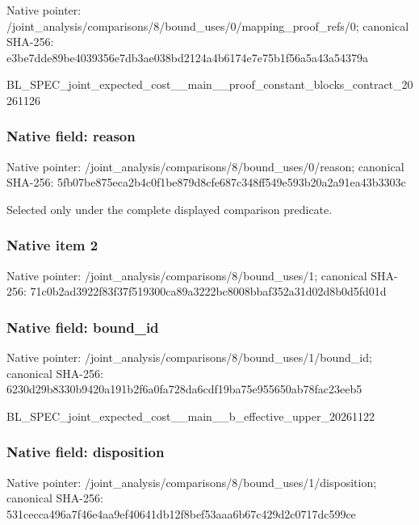 \documentclass[10pt,a4paper]{article}
\begin{document}
Native pointer: /joint\_analysis/comparis\allowbreak{}ons/8/bound\_uses/0/mappi\allowbreak{}ng\_proof\_refs/0; canonical SHA-256: e3be7dde89be4039356e7db3\allowbreak{}ae038bd2124a4b6174e7e75b\allowbreak{}1f56a5a43a54379a


BL\_SPEC\_joint\_expected\_c\allowbreak{}ost\_\_main\_\_proof\_constan\allowbreak{}t\_blocks\_contract\_202611\allowbreak{}26


\subsubsection{Native field: reason}


Native pointer: /joint\_analysis/comparis\allowbreak{}ons/8/bound\_uses/0/reaso\allowbreak{}n; canonical SHA-256: 5fb07be875eca2b4c0f1be87\allowbreak{}9d8cfe687c348ff549e593b2\allowbreak{}0a2a91ea43b3303c


Selected only under the complete displayed comparison predicate.


\subsubsection{Native item 2}


Native pointer: /joint\_analysis/comparis\allowbreak{}ons/8/bound\_uses/1; canonical SHA-256: 71c0b2ad3922f83f37f51930\allowbreak{}0ca89a3222bc8008bbaf352a\allowbreak{}31d02d8b0d5fd01d



\subsubsection{Native field: bound\_id}


Native pointer: /joint\_analysis/comparis\allowbreak{}ons/8/bound\_uses/1/bound\allowbreak{}\_id; canonical SHA-256: 6230d29b8330b9420a191b2f\allowbreak{}6a0fa728da6cdf19ba75e955\allowbreak{}650ab78fac23eeb5


BL\_SPEC\_joint\_expected\_c\allowbreak{}ost\_\_main\_\_b\_effective\_u\allowbreak{}pper\_20261122


\subsubsection{Native field: disposition}


Native pointer: /joint\_analysis/comparis\allowbreak{}ons/8/bound\_uses/1/dispo\allowbreak{}sition; canonical SHA-256: 531cecca496a7f46e4aa9ef4\allowbreak{}0641db12f8bef53aaa6b67c4\allowbreak{}29d2c0717dc599ce
\end{document}

